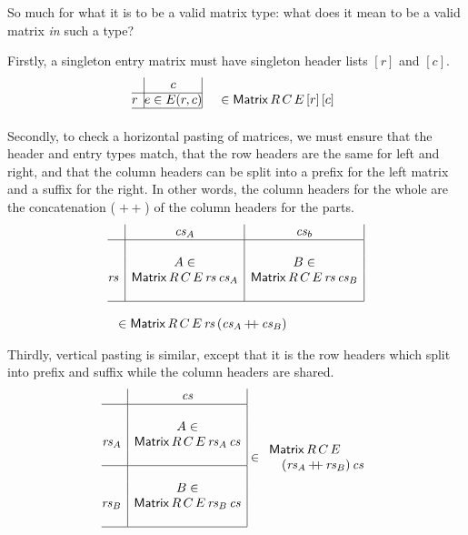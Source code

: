 \documentclass{IMEKO2024}
\newcommand{\append}{\mathop{+\!\!+}}
\newcommand{\Matrix}[5]{\mathsf{Matrix}\,#1\,#2\,#3\,#4\,#5}
\newcommand{\remph}{\emph}
\begin{document}
So much for what it is to be a valid matrix type: what does it mean to be a valid matrix \remph{in} such a type?

Firstly, a singleton entry matrix must have singleton header lists $[r]$ and $[c]$.
\[\begin{array}[b]{@{}r|@{}c@{}|l}
\; & c \\
\cline{1-2}
r  & e\in E(r,c) & \quad \in \Matrix{R}{C}{E}{[r]}{[c]} \\
\cline{1-2}
\end{array} 
\]

Secondly, to check a horizontal pasting of matrices, we must ensure that the header and entry types match, that the row headers are the same for left and right, and that the column headers can be split into a prefix for the left matrix and a suffix for the right. In other words, the column headers for the whole are the concatenation ($\append$) of the column headers for the parts.
\[\begin{array}{l}
\begin{array}{@{}r|c|c|}
  & \cs_A & \cs_b \\
\hline
&&\\
&A \in & B \in \\
\rs &\Matrix{R}{C}{E}{\rs}{\cs_A} & \Matrix{R}{C}{E}{\rs}{\cs_B} \\
&&\\
\hline
\end{array}\bigskip\\
\;\;\; \in \Matrix{R}{C}{E}{\rs}{(\cs_A\append\cs_B)}
\end{array}\]

Thirdly, vertical pasting is similar, except that it is the row headers which split into prefix and suffix while the column headers are shared.
\[
\begin{array}[c]{@{}r|c|}
  & \cs \\
  \hline
  \;    & \\
  \;    & A \in \\
  \rs_A & \Matrix{R}{C}{E}{\rs_A}{\cs} \\
  \;    & \\
  \hline
  \;    & \\
  \;    & B \in \\
  \rs_B & \Matrix{R}{C}{E}{\rs_B}{\cs} \\
  \;    & \\
  \hline
\end{array}
\in
\begin{array}{l}
\Matrix{R}{C}{E}{\\ \quad (\rs_A\append\rs_B)}{\cs}
\end{array}
\]
\end{document}
